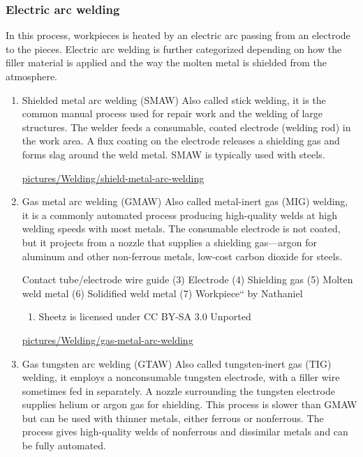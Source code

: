 \documentclass[a4paper,openany,nobib]{tufte-book}
\begin{document}
{{\subsubsection{Electric arc welding}
\label{electric-arc-welding}
In this process, workpieces is heated by an electric arc passing from an
electrode to the pieces. Electric arc welding is further categorized
depending on how the filler material is applied and the way the molten
metal is shielded from the atmosphere.

\begin{enumerate}
\item Shielded metal arc welding (SMAW)
\label{shielded-metal-arc-welding-smaw}
Also called stick welding, it is the common manual process used for
repair work and the welding of large structures. The welder feeds a
consumable, coated electrode (welding rod) in the work area. A flux
coating on the electrode releases a shielding gas and forms slag around
the weld metal. SMAW is typically used with steels.


\url{pictures/Welding/shield-metal-arc-welding}

\item Gas metal arc welding (GMAW)
\label{gas-metal-arc-welding-gmaw}
Also called metal-inert gas (MIG) welding, it is a commonly automated
process producing high-quality welds at high welding speeds with most
metals. The consumable electrode is not coated, but it projects from a
nozzle that supplies a shielding gas---argon for aluminum and other
non-ferrous metals, low-cost carbon dioxide for steels.


Contact tube/electrode wire guide (3) Electrode (4) Shielding gas (5)
Molten weld metal (6) Solidified weld metal (7) Workpiece`` by Nathaniel
\begin{enumerate}
\item Sheetz is licensed under CC BY-SA 3.0 Unported
\end{enumerate}
\url{pictures/Welding/gas-metal-arc-welding}

\item Gas tungsten arc welding (GTAW)
\label{gas-tungsten-arc-welding-gtaw}
Also called tungsten-inert gas (TIG) welding, it employs a nonconsumable
tungsten electrode, with a filler wire sometimes fed in separately. A
nozzle surrounding the tungsten electrode supplies helium or argon gas
for shielding. This process is slower than GMAW but can be used with
thinner metals, either ferrous or nonferrous. The process gives
high-quality welds of nonferrous and dissimilar metals and can be fully
automated.



\end{enumerate}}}
\end{document}
